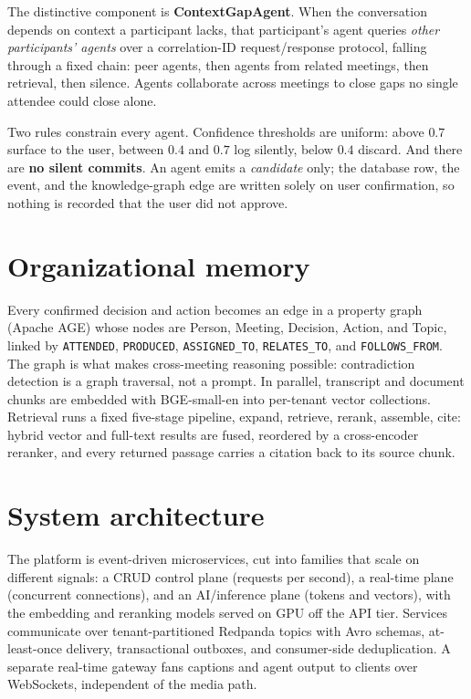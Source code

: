 \documentclass[10pt,a4paper]{article}
\begin{document}
The distinctive component is \textbf{ContextGapAgent}. When the conversation
depends on context a participant lacks, that participant's agent queries
\emph{other participants' agents} over a correlation-ID request/response
protocol, falling through a fixed chain: peer agents, then agents from related
meetings, then retrieval, then silence. Agents collaborate across meetings to
close gaps no single attendee could close alone.

Two rules constrain every agent. Confidence thresholds are uniform: above $0.7$
surface to the user, between $0.4$ and $0.7$ log silently, below $0.4$ discard.
And there are \textbf{no silent commits}. An agent emits a \emph{candidate}
only; the database row, the event, and the knowledge-graph edge are written
solely on user confirmation, so nothing is recorded that the user did not
approve.

\section{Organizational memory}

Every confirmed decision and action becomes an edge in a property graph
(Apache AGE) whose nodes are Person, Meeting, Decision, Action, and Topic,
linked by \texttt{ATTENDED}, \texttt{PRODUCED}, \texttt{ASSIGNED\_TO},
\texttt{RELATES\_TO}, and \texttt{FOLLOWS\_FROM}. The graph is what makes
cross-meeting reasoning possible: contradiction detection is a graph traversal,
not a prompt. In parallel, transcript and document chunks are embedded with
BGE-small-en into per-tenant vector collections. Retrieval runs a fixed
five-stage pipeline, expand, retrieve, rerank, assemble, cite: hybrid vector
and full-text results are fused, reordered by a cross-encoder reranker, and
every returned passage carries a citation back to its source chunk.

\section{System architecture}

The platform is event-driven microservices, cut into families that scale on
different signals: a CRUD control plane (requests per second), a real-time
plane (concurrent connections), and an AI/inference plane (tokens and vectors),
with the embedding and reranking models served on GPU off the API tier.
Services communicate over tenant-partitioned Redpanda topics with Avro schemas,
at-least-once delivery, transactional outboxes, and consumer-side
deduplication. A separate real-time gateway fans captions and agent output to
clients over WebSockets, independent of the media path.
\end{document}
